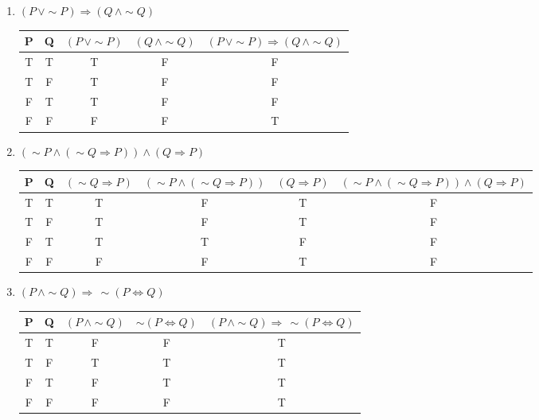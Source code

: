 \documentclass{article}
\begin{document}
\begin{enumerate}[labelindent=0pt,leftmargin=0pt]
\begin{enumerate}
        \item $(P\,\lor\sim\! P)\Rightarrow (Q\,\land\sim\!Q)$
                  
        \begin{flushleft}
         \begin{tabular}{||c c c c c||} 
        \hline
        P & Q & $(P\,\lor\sim\! P)$ & $(Q\,\land\sim\!Q)$ & $(P\,\lor\sim\! P)\Rightarrow (Q\,\land\sim\!Q)$ \\ [0.5ex] 
        \hline\hline
        T & T & T & F & F \\
        T & F & T & F & F \\
        F & T & T & F & F \\
        F & F & F & F & T \\
        \hline
        \end{tabular}
        \end{flushleft}
        
        \item $(\sim\! P\land (\sim Q\Rightarrow P))\land (Q\Rightarrow P)$

        \begin{flushleft}
        \begin{tabular}{||c c c c c c ||} 
        \hline
        P & Q & $(\sim Q\Rightarrow P)$ & $(\sim\! P\land (\sim Q\Rightarrow P))$ & $(Q\Rightarrow P)$ & $(\sim\! P\land (\sim Q\Rightarrow P))\land (Q\Rightarrow P)$ \\ [0.5ex] 
        \hline\hline
        T & T & T & F & T & F \\
        T & F & T & F & T & F \\
        F & T & T & T & F & F \\
        F & F & F & F & T & F \\
        \hline
        \end{tabular}
        \end{flushleft}
        
        \item $(P\,\land \sim\! Q)\Rightarrow\,\sim\!(P\Leftrightarrow Q)$

        \begin{flushleft}
        \begin{tabular}{||c c c c c||} 
        \hline
        P & Q & $(P\,\land \sim\! Q)$ & $\sim\!(P\Leftrightarrow Q)$ & $(P\,\land \sim\! Q)\Rightarrow\,\sim\!(P\Leftrightarrow Q)$ \\ [0.5ex] 
        \hline\hline
        T & T & F & F & T \\
        T & F & T & T & T \\
        F & T & F & T & T \\
        F & F & F & F & T \\
        \hline
        \end{tabular}
        \end{flushleft}
    \end{enumerate}


\end{enumerate}
\end{document}
